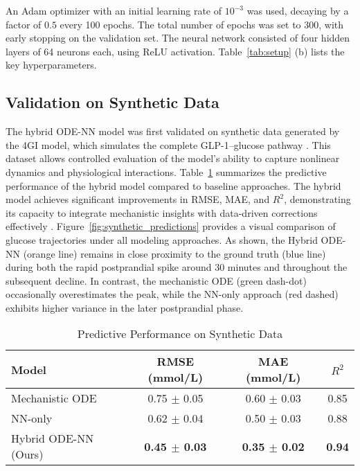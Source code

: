 \documentclass[9pt,shortpaper,twoside,web]{ieeecolor}
\begin{document}
An Adam optimizer \cite{kingma2014adam} with an initial learning rate of $10^{-3}$ was used, decaying by a factor of $0.5$ every 100 epochs. The total number of epochs was set to 300, with early stopping on the validation set. The neural network consisted of four hidden layers of 64 neurons each, using ReLU activation. Table~\ref{tab:setup} (b) lists the key hyperparameters.


\subsection{Validation on Synthetic Data}

The hybrid ODE-NN model was first validated on synthetic data generated by the 4GI model, which simulates the complete GLP-1–glucose pathway \cite{camps2020lap}. This dataset allows controlled evaluation of the model's ability to capture nonlinear dynamics and physiological interactions. Table~\ref{tab:synthetic_results} summarizes the predictive performance of the hybrid model compared to baseline approaches. The hybrid model achieves significant improvements in RMSE, MAE, and \(R^2\), demonstrating its capacity to integrate mechanistic insights with data-driven corrections effectively \cite{breiman2001random}. Figure~\ref{fig:synthetic_predictions} provides a visual comparison of glucose trajectories under all modeling approaches. As shown, the Hybrid ODE-NN (orange line) remains in close proximity to the ground truth (blue line) during both the rapid postprandial spike around 30 minutes and throughout the subsequent decline. In contrast, the mechanistic ODE (green dash-dot) occasionally overestimates the peak, while the NN-only approach (red dashed) exhibits higher variance in the later postprandial phase.


\begin{table}[h]
\centering
\caption{Predictive Performance on Synthetic Data}
\label{tab:synthetic_results}
\begin{tabular}{l|c|c|c}
\hline
\textbf{Model}         & \textbf{RMSE (mmol/L)} & \textbf{MAE (mmol/L)} & \textbf{\(R^2\)} \\ \hline
Mechanistic ODE         & 0.75 $\pm$ 0.05       & 0.60 $\pm$ 0.03       & 0.85 \\
NN-only                 & 0.62 $\pm$ 0.04       & 0.50 $\pm$ 0.03       & 0.88 \\
Hybrid ODE-NN (Ours)    & \textbf{0.45 $\pm$ 0.03} & \textbf{0.35 $\pm$ 0.02} & \textbf{0.94} \\ \hline
\end{tabular}
\end{table}
\end{document}
